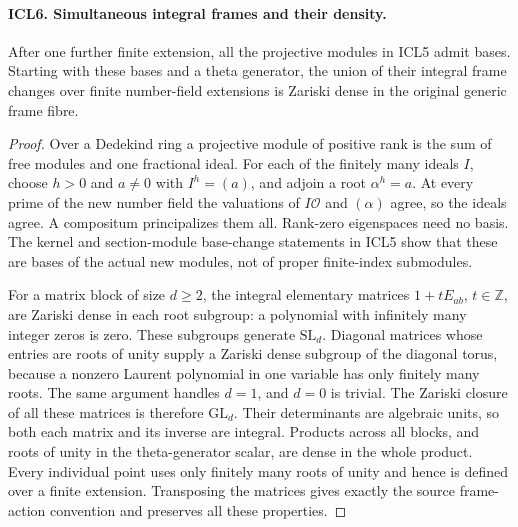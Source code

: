 \documentclass[11pt,a4paper]{article}
\numberwithin{equation}{section}
\theoremstyle{remark}\newtheorem{remark}[theorem]{Remark}
\begin{document}
\paragraph{ICL6. Simultaneous integral frames and their density.}
\label{claim:ICL6}
After one further finite extension, all the projective
modules in ICL5 admit bases.  Starting with these bases and a
theta generator, the union of their integral frame changes
over finite number-field extensions is Zariski dense in the
original generic frame fibre.
\begin{proof}
Over a Dedekind ring a projective module of positive rank is
the sum of free modules and one fractional ideal.  For each
of the finitely many ideals \(I\), choose \(h>0\) and \(a\ne0\)
with \(I^h=(a)\), and adjoin a root \(\alpha^h=a\).  At every
prime of the new number field the valuations of
\(I\mathcal O\) and \((\alpha)\) agree, so the ideals agree.
A compositum principalizes them all.  Rank-zero eigenspaces
need no basis.  The kernel and section-module base-change
statements in ICL5 show that these are bases of the actual
new modules, not of proper finite-index submodules.

For a matrix block of size \(d\geq2\), the integral
elementary matrices \(1+tE_{ab}\), \(t\in\mathbb Z\), are
Zariski dense in each root subgroup: a polynomial with
infinitely many integer zeros is zero.  These subgroups
generate \(\mathrm{SL}_d\).  Diagonal matrices whose entries
are roots of unity supply a Zariski dense subgroup of the
diagonal torus, because a nonzero Laurent polynomial in one
variable has only finitely many roots.  The same argument
handles \(d=1\), and \(d=0\) is trivial.  The Zariski closure
of all these matrices is therefore \(\mathrm{GL}_d\).
Their determinants are algebraic units, so both each matrix
and its inverse are integral.  Products across all blocks,
and roots of unity in the theta-generator scalar, are dense
in the whole product.  Every individual point uses only
finitely many roots of unity and hence is defined over a
finite extension.  Transposing the matrices gives exactly
the source frame-action convention and preserves all these
properties.
\end{proof}

\end{document}
